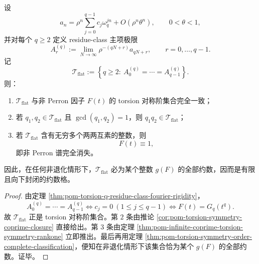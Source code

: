 \begin{theorem}[互素剩余平坦的刚性崩塌定理]\label{thm:conclusion-coprime-residue-flatness-rigidity-collapse}
设
\[
a_n=\rho^n\sum_{j=0}^{q-1} c_j\omega_q^{jn}+O(\rho^n\theta^n),
\qquad 0<\theta<1,
\]
并对每个 \(q\ge 2\) 定义 residue-class 主项极限
\[
A_r^{(q)}:=\lim_{N\to\infty}\rho^{-(qN+r)}a_{qN+r},
\qquad
r=0,\dots,q-1.
\]
记
\[
\mathcal T_{\mathrm{flat}}
:=
\left\{
q\ge 2:\ A_0^{(q)}=\cdots=A_{q-1}^{(q)}
\right\}.
\]
则：
\begin{enumerate}
\normalfont
  \item \(\mathcal T_{\mathrm{flat}}\) 与非 Perron 因子 \(F(t)\) 的 torsion 对称阶集合完全一致；
  \item 若 \(q_1,q_2\in \mathcal T_{\mathrm{flat}}\) 且 \(\gcd(q_1,q_2)=1\)，则 \(q_1q_2\in \mathcal T_{\mathrm{flat}}\)；
  \item 若 \(\mathcal T_{\mathrm{flat}}\) 含有无穷多个两两互素的整数，则
  \[
  F(t)\equiv 1,
  \]
  即非 Perron 谱完全消失。
\end{enumerate}
因此，在任何非退化情形下，\(\mathcal T_{\mathrm{flat}}\) 必为某个整数 \(g(F)\) 的全部约数，因而是有限且向下封闭的约数格。
\end{theorem}
\begin{proof}
由定理 \ref{thm:pom-torsion-q-residue-class-fourier-rigidity}，
\[
A_0^{(q)}=\cdots=A_{q-1}^{(q)}
\iff
c_j=0\ (1\le j\le q-1)
\iff
F(t)=G_q(t^q).
\]
故 \(\mathcal T_{\mathrm{flat}}\) 正是 torsion 对称阶集合。第 \(2\) 条由推论 \ref{cor:pom-torsion-symmetry-coprime-closure} 直接给出。第 \(3\) 条由定理 \ref{thm:pom-infinite-coprime-torsion-symmetry-rankone} 立即推出。最后再用定理 \ref{thm:pom-torsion-symmetry-order-complete-classification}，便知在非退化情形下该集合恰为某个 \(g(F)\) 的全部约数。证毕。
\end{proof}

